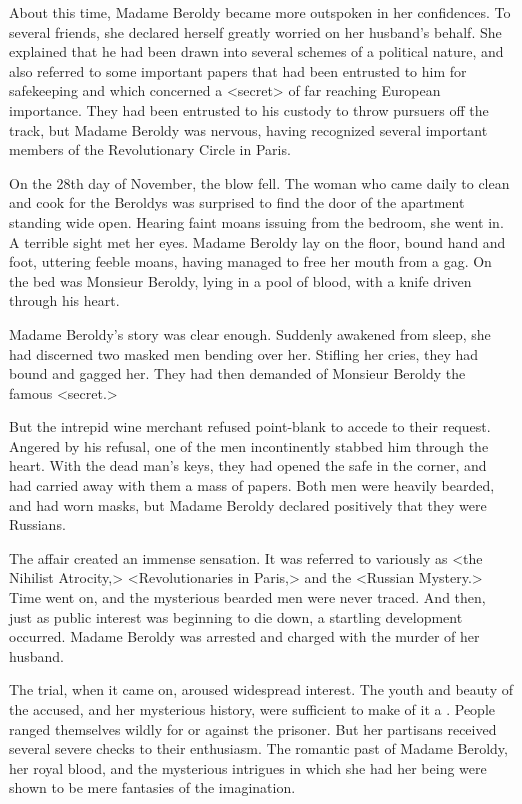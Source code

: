  About this time, Madame Beroldy became more outspoken in her confidences. To several friends, she declared herself greatly worried on her husband's behalf. She explained that he had been drawn into several schemes of a political nature, and also referred to some important papers that had been entrusted to him for safekeeping and which concerned a <secret> of far reaching European importance. They had been entrusted to his custody to throw pursuers off the track, but Madame Beroldy was nervous, having recognized several important members of the Revolutionary Circle in Paris. 

 On the 28th day of November, the blow fell. The woman who came daily to clean and cook for the Beroldys was surprised to find the door of the apartment standing wide open. Hearing faint moans issuing from the bedroom, she went in. A terrible sight met her eyes. Madame Beroldy lay on the floor, bound hand and foot, uttering feeble moans, having managed to free her mouth from a gag. On the bed was Monsieur Beroldy, lying in a pool of blood, with a knife driven through his heart. 

 Madame Beroldy's story was clear enough. Suddenly awakened from sleep, she had discerned two masked men bending over her. Stifling her cries, they had bound and gagged her. They had then demanded of Monsieur Beroldy the famous <secret.> 

 But the intrepid wine merchant refused point-blank to accede to their request. Angered by his refusal, one of the men incontinently stabbed him through the heart. With the dead man's keys, they had opened the safe in the corner, and had carried away with them a mass of papers. Both men were heavily bearded, and had worn masks, but Madame Beroldy declared positively that they were Russians. 

 The affair created an immense sensation. It was referred to variously as <the Nihilist Atrocity,> <Revolutionaries in Paris,> and the <Russian Mystery.> Time went on, and the mysterious bearded men were never traced. And then, just as public interest was beginning to die down, a startling development occurred. Madame Beroldy was arrested and charged with the murder of her husband. 

 The trial, when it came on, aroused widespread interest. The youth and beauty of the accused, and her mysterious history, were sufficient to make of it a . People ranged themselves wildly for or against the prisoner. But her partisans received several severe checks to their enthusiasm. The romantic past of Madame Beroldy, her royal blood, and the mysterious intrigues in which she had her being were shown to be mere fantasies of the imagination. 

